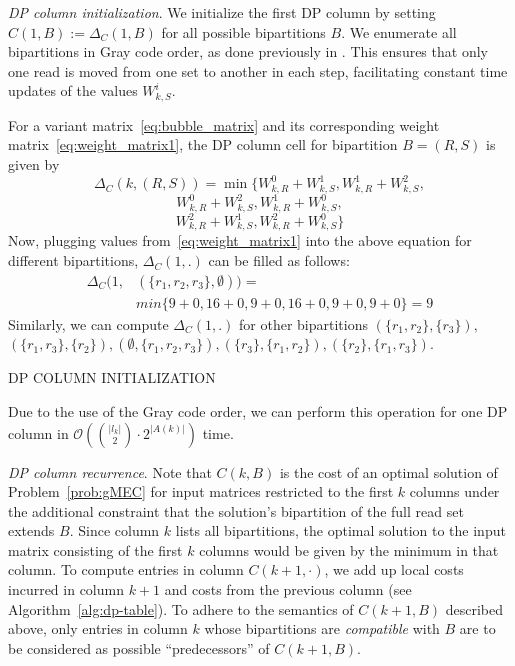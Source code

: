 \textit{DP column initialization}. 
We initialize the first DP column by setting $C(1,B):=\Delta_C(1,B)$ for all possible bipartitions $B$.
We enumerate all bipartitions in Gray code order, as done previously in \cite{Patterson2015}.
This ensures that only one read is moved from one set to another in each step, facilitating constant time updates of the values $W_{k,S}^i$.

For a variant matrix~\eqref{eq:bubble_matrix} and its corresponding weight matrix~\eqref{eq:weight_matrix1}, the DP column cell for bipartition $B=(R,S)$ is given by
\[\Delta_C(k,(R,S))= \min\big\{W^0_{k,R} + W^1_{k,S}, W^1_{k,R} + W^2_{k,S}, \]
\[W^0_{k,R} + W^2_{k,S}, W^1_{k,R} + W^0_{k,S},\]
\[W^2_{k,R} + W^1_{k,S}, W^2_{k,R} + W^0_{k,S} \big\}\]
Now, plugging values from~\eqref{eq:weight_matrix1} into the above equation for different bipartitions, $\Delta_C(1,.)$ can be filled as follows:
\[
\begin{split}
\Delta_C(1,& (\{r_1,r_2,r_3\},\emptyset)) =\\ & min\{9+0, 16+0, 9+0,16+0, 9+0, 9+0\} = 9 
\end{split}
\]
Similarly, we can compute $\Delta_C(1,.)$ for other bipartitions $(\{r_1,r_2\},\{r_3\}),$\\
$(\{r_1,r_3\},\{r_2\}), (\emptyset,\{r_1,r_2,r_3\}), (\{r_3\},\{r_1,r_2\}), (\{r_2\},\{r_1,r_3\})$.

\begin{algorithm}
    \caption{\label{alg:dp-column}\textsc{DP COLUMN INITIALIZATION}}
\end{algorithm}
Due to the use of the Gray code order, we can perform this operation for one DP column in $\mathcal{O}( {|l_k| \choose 2} \cdot 2^{|A(k)|})$ time.

\textit{DP column recurrence}.
Note that $C(k,B)$ is the cost of an optimal solution of Problem~\ref{prob:gMEC} for input matrices restricted to the first $k$ columns under the additional constraint that the solution's bipartition of the full read set extends $B$.
Since column $k$ lists all bipartitions, the optimal solution to the input matrix consisting of the first $k$ columns would be given by the minimum in that column.
To compute entries in column $C(k+1,\cdot)$, we add up local costs incurred in column $k+1$ and costs from the previous column (see Algorithm~\ref{alg:dp-table}).
To adhere to the semantics of $C(k+1,B)$ described above, only entries in column $k$ whose bipartitions are \emph{compatible} with $B$ are to be considered as possible ``predecessors'' of $C(k+1, B)$.

